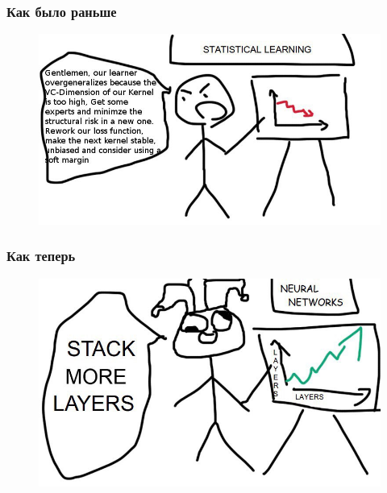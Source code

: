\documentclass[fullscreen=true, bookmarks=false]{beamer} %
\begin{document}
\begin{frame}{}
\frametitle{Как было раньше}
\begin{figure}[]
\includegraphics[scale=0.4]{past} 
\end{figure}


\end{frame}


\begin{frame}{}
\frametitle{Как теперь}
\begin{figure}[]
\includegraphics[scale=0.35]{future} 
\end{figure}


\end{frame}

\end{document}
